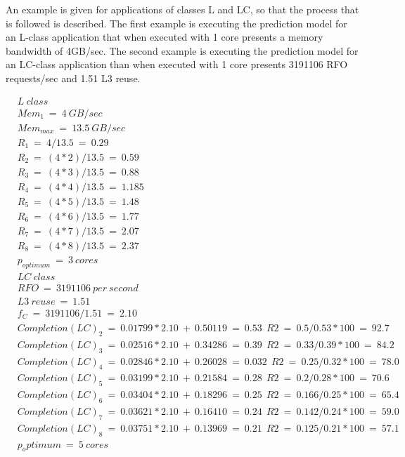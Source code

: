 \documentclass[diploma]{Styles/softlab-thesis}
\begin{document}
An example is given for applications of classes L and LC, so that the process that is followed is described. The first example is executing the prediction model for an L-class application that when executed with 1 core presents a memory bandwidth of 4GB/sec. The second example is executing the prediction model for an LC-class application than when executed with 1 core presents 3191106 RFO requests/sec and 1.51 L3 reuse.

\begin{align*}
&L\ class \\[3pt]
&Mem_{1}\ =\ 4\ GB/sec \\[3pt]
&Mem_{max}\ =\ 13.5\ GB/sec \\[3pt]
&R_{1}\ =\ 4/13.5\ =\ 0.29 \\[3pt]
&R_{2}\ =\ (4*2)/13.5\ =\ 0.59 \\[3pt]
&R_{3}\ =\ (4*3)/13.5\ =\ 0.88 \\[3pt]
&R_{4}\ =\ (4*4)/13.5\ =\ 1.185 \\[3pt]
&R_{5}\ =\ (4*5)/13.5\ =\ 1.48 \\[3pt]
&R_{6}\ =\ (4*6)/13.5\ =\ 1.77 \\[3pt]
&R_{7}\ =\ (4*7)/13.5\ =\ 2.07 \\[3pt]
&R_{8}\ =\ (4*8)/13.5\ =\ 2.37 \\[3pt]
&p_{optimum}\ =\ 3\ cores \\[12pt]
&LC\ class    \\[3pt]
&RFO\ =\ 3191106\  per\  second \\[3pt] 
&L3\ reuse\ =\ 1.51 \\[3pt]
&f_{C}\ =\ 3191106/1.51\ =\ 2.10 \\[3pt]
&Completion(LC)_{2}\ =\ 0.01799*2.10\ +\ 0.50119\ =\ 0.53\ \ R2\ =\ 0.5/0.53*100\ =\ 92.7 \\[3pt]
&Completion(LC)_{3}\ =\ 0.02516*2.10\ +\ 0.34286\ =\ 0.39\ \ R2\ =\ 0.33/0.39*100\ =\ 84.2 \\[3pt]
&Completion(LC)_{4}\ =\ 0.02846*2.10\ +\ 0.26028\ =\ 0.032\ \ R2\ =\ 0.25/0.32*100\ =\ 78.0 \\[3pt]
&Completion(LC)_{5}\ =\ 0.03199*2.10\ +\ 0.21584\ =\ 0.28\ \ R2\ =\ 0.2/0.28*100\ =\ 70.6 \\[3pt]
&Completion(LC)_{6}\ =\ 0.03404*2.10\ +\ 0.18296\ =\ 0.25\ \ R2\ =\ 0.166/0.25*100\ =\ 65.4 \\[3pt]
&Completion(LC)_{7}\ =\ 0.03621*2.10\ +\ 0.16410\ =\ 0.24\ \ R2\ =\ 0.142/0.24*100\ =\ 59.0 \\[3pt]
&Completion(LC)_{8}\ =\ 0.03751*2.10\ +\ 0.13969\ =\ 0.21\ \ R2\ =\ 0.125/0.21*100\ =\ 57.1 \\[3pt]
&p_optimum\ =\ 5\ cores
\end{align*}
\end{document}

